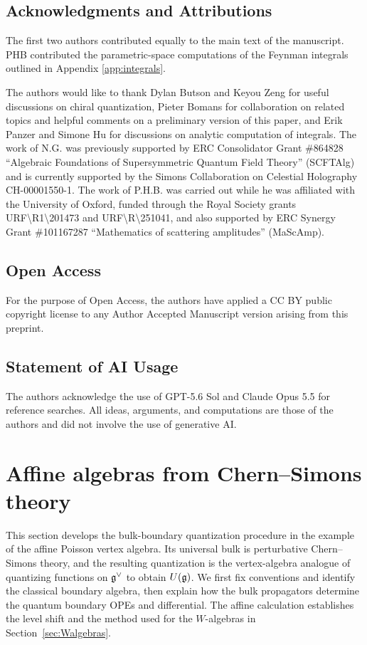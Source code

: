 \documentclass[11pt]{amsart}
\numberwithin{equation}{section}
\numberwithin{figure}{section}
\numberwithin{table}{section}
\begin{document}
\subsection*{Acknowledgments and Attributions}
The first two authors contributed equally to the main text of the manuscript.
PHB contributed the parametric-space computations of the Feynman integrals outlined in Appendix \ref{app:integrals}.

The authors would like to thank Dylan Butson and Keyou Zeng for useful discussions on chiral quantization, Pieter Bomans for collaboration on related topics and helpful comments on a preliminary version of this paper, and Erik Panzer and Simone Hu for discussions on analytic computation of integrals.
The work of N.G. was previously supported by ERC Consolidator Grant \#864828 \enquote{Algebraic Foundations of Supersymmetric Quantum Field Theory} (SCFTAlg) and is currently supported by the Simons Collaboration on Celestial Holography CH-00001550-1. The work of P.H.B. was  carried out while he was affiliated with the University of Oxford, funded through the Royal Society grants URF{\textbackslash}R1{\textbackslash}201473 and URF{\textbackslash}R{\textbackslash}251041, and also supported by ERC Synergy Grant \#101167287 \enquote{Mathematics of scattering amplitudes} (MaScAmp).

\subsection*{Open Access}
For the purpose of Open Access, the authors have applied a CC BY public copyright license to any Author Accepted Manuscript version arising from this preprint.

\subsection*{Statement of AI Usage}
The authors acknowledge the use of GPT-5.6 Sol and Claude Opus 5.5 for reference searches.
All ideas, arguments, and computations are those of the authors and did not involve the use of generative AI.

\section{Affine algebras from Chern--Simons theory}\label{sec:CSAffinePVA}

This section develops the bulk-boundary quantization procedure in the example of the affine Poisson vertex algebra.
Its universal bulk is perturbative Chern--Simons theory, and the resulting quantization is the vertex-algebra analogue of quantizing functions on $\mathfrak{g}^\vee$ to obtain $U(\mathfrak{g})$.
We first fix conventions and identify the classical boundary algebra, then explain how the bulk propagators determine the quantum boundary OPEs and differential.
The affine calculation establishes the level shift and the method used for the $W$-algebras in Section~\ref{sec:Walgebras}.
\end{document}
